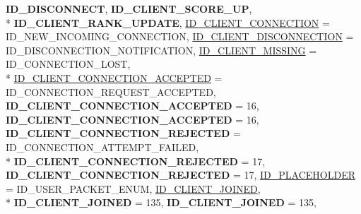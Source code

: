 \begin{DoxyCompactItemize}
{\bfseries I\-D\-\_\-\-D\-I\-S\-C\-O\-N\-N\-E\-C\-T}, 
{\bfseries I\-D\-\_\-\-C\-L\-I\-E\-N\-T\-\_\-\-S\-C\-O\-R\-E\-\_\-\-U\-P}, 
\\*
{\bfseries I\-D\-\_\-\-C\-L\-I\-E\-N\-T\-\_\-\-R\-A\-N\-K\-\_\-\-U\-P\-D\-A\-T\-E}, 
\hyperlink{namespace_champ_net_plugin_a2ade5cfa7cf6c25ab7236c6b54a57821aecc0564c52e3106cfe012e5533b080da}{I\-D\-\_\-\-C\-L\-I\-E\-N\-T\-\_\-\-C\-O\-N\-N\-E\-C\-T\-I\-O\-N} = I\-D\-\_\-\-N\-E\-W\-\_\-\-I\-N\-C\-O\-M\-I\-N\-G\-\_\-\-C\-O\-N\-N\-E\-C\-T\-I\-O\-N, 
\hyperlink{namespace_champ_net_plugin_a2ade5cfa7cf6c25ab7236c6b54a57821a2ed0fbbbbe782bca6c76277c89050ad9}{I\-D\-\_\-\-C\-L\-I\-E\-N\-T\-\_\-\-D\-I\-S\-C\-O\-N\-N\-E\-C\-T\-I\-O\-N} = I\-D\-\_\-\-D\-I\-S\-C\-O\-N\-N\-E\-C\-T\-I\-O\-N\-\_\-\-N\-O\-T\-I\-F\-I\-C\-A\-T\-I\-O\-N, 
\hyperlink{namespace_champ_net_plugin_a2ade5cfa7cf6c25ab7236c6b54a57821a31932f93b241ffddf903d32af0fc2155}{I\-D\-\_\-\-C\-L\-I\-E\-N\-T\-\_\-\-M\-I\-S\-S\-I\-N\-G} = I\-D\-\_\-\-C\-O\-N\-N\-E\-C\-T\-I\-O\-N\-\_\-\-L\-O\-S\-T, 
\\*
\hyperlink{namespace_champ_net_plugin_a2ade5cfa7cf6c25ab7236c6b54a57821a0295101371b4a70a1c007a4f6e206e1d}{I\-D\-\_\-\-C\-L\-I\-E\-N\-T\-\_\-\-C\-O\-N\-N\-E\-C\-T\-I\-O\-N\-\_\-\-A\-C\-C\-E\-P\-T\-E\-D} = I\-D\-\_\-\-C\-O\-N\-N\-E\-C\-T\-I\-O\-N\-\_\-\-R\-E\-Q\-U\-E\-S\-T\-\_\-\-A\-C\-C\-E\-P\-T\-E\-D, 
{\bfseries I\-D\-\_\-\-C\-L\-I\-E\-N\-T\-\_\-\-C\-O\-N\-N\-E\-C\-T\-I\-O\-N\-\_\-\-A\-C\-C\-E\-P\-T\-E\-D} = 16, 
{\bfseries I\-D\-\_\-\-C\-L\-I\-E\-N\-T\-\_\-\-C\-O\-N\-N\-E\-C\-T\-I\-O\-N\-\_\-\-A\-C\-C\-E\-P\-T\-E\-D} = 16, 
{\bfseries I\-D\-\_\-\-C\-L\-I\-E\-N\-T\-\_\-\-C\-O\-N\-N\-E\-C\-T\-I\-O\-N\-\_\-\-R\-E\-J\-E\-C\-T\-E\-D} = I\-D\-\_\-\-C\-O\-N\-N\-E\-C\-T\-I\-O\-N\-\_\-\-A\-T\-T\-E\-M\-P\-T\-\_\-\-F\-A\-I\-L\-E\-D, 
\\*
{\bfseries I\-D\-\_\-\-C\-L\-I\-E\-N\-T\-\_\-\-C\-O\-N\-N\-E\-C\-T\-I\-O\-N\-\_\-\-R\-E\-J\-E\-C\-T\-E\-D} = 17, 
{\bfseries I\-D\-\_\-\-C\-L\-I\-E\-N\-T\-\_\-\-C\-O\-N\-N\-E\-C\-T\-I\-O\-N\-\_\-\-R\-E\-J\-E\-C\-T\-E\-D} = 17, 
\hyperlink{namespace_champ_net_plugin_a2ade5cfa7cf6c25ab7236c6b54a57821a6acf78ef40fd50b2e823237ea828fc1b}{I\-D\-\_\-\-P\-L\-A\-C\-E\-H\-O\-L\-D\-E\-R} = I\-D\-\_\-\-U\-S\-E\-R\-\_\-\-P\-A\-C\-K\-E\-T\-\_\-\-E\-N\-U\-M, 
\hyperlink{namespace_champ_net_plugin_a2ade5cfa7cf6c25ab7236c6b54a57821aeb7ac0bb4cb955cc0b7a3bebc9f14774}{I\-D\-\_\-\-C\-L\-I\-E\-N\-T\-\_\-\-J\-O\-I\-N\-E\-D}, 
\\*
{\bfseries I\-D\-\_\-\-C\-L\-I\-E\-N\-T\-\_\-\-J\-O\-I\-N\-E\-D} = 135, 
{\bfseries I\-D\-\_\-\-C\-L\-I\-E\-N\-T\-\_\-\-J\-O\-I\-N\-E\-D} = 135, 

\end{DoxyCompactItemize}
